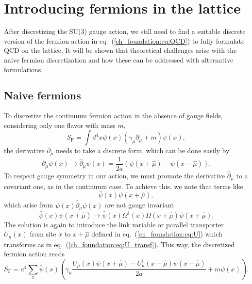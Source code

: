 \section{Introducing fermions in the lattice}
\label{ch_foundation:sec:Fermions}


After discretizing the SU(3) gauge action, we still need to find a suitable discrete version of the fermion action in eq.~(\ref{ch_foundation:eq:QCD}) to fully formulate QCD on the lattice. It will be shown that theoretical challenges arise with the naive fermion discretization and how these can be addressed with alternative formulations.

\subsection{Naive fermions}
\label{ch_foundation:subsec:Naive}

To discretize the continuum fermion action in the absence of gauge fields, considering only one flavor with mass $m$,
\begin{equation}
S_{\textrm{F}}=\int d^4x\bar{\psi}(x)\left(\gamma_{\mu}\partial_{\mu}+m\right)\psi(x),
\end{equation}
the derivative $\partial_{\mu}$ needs to take a discrete form, which can be done easily by
\begin{equation}
\partial_{\mu}\psi(x)\rightarrow\hat{\partial}_{\mu}\psi(x)=\frac{1}{2a}\left(\psi(x+\hat{\mu})-\psi(x-\hat{\mu})\right).
\end{equation}
To respect gauge symmetry in our action, we must promote the derivative $\hat{\partial}_{\mu}$ to a covariant one, as in the continuum case. To achieve this, we note that terms like
\begin{equation}
\bar{\psi}(x)\psi(x+\hat{\mu}),
\end{equation}
which arise from $\bar{\psi}(x)\hat{\partial}_{\mu}\psi(x)$ are not gauge invariant
\begin{equation}
\bar{\psi}(x)\psi(x+\hat{\mu})\to\bar{\psi}(x)\Omega^{\dagger}(x)\Omega(x+\hat{\mu})\psi(x+\hat{\mu}).
\end{equation}
The solution is again to introduce the link variable or parallel transporter $U_{\mu}(x)$ from site $x$ to $x+\hat{\mu}$ defined in eq.~(\ref{ch_foundation:eq:U}) which transforms as in eq.~(\ref{ch_foundation:eq:U_transf}). This way, the discretized fermion action reads
\begin{equation}
\label{ch_foundation:eq:naive}
S_{\textrm{F}}=a^4\sum_x\bar{\psi}(x)\left(\gamma_{\mu}\frac{U_{\mu}(x)\psi(x+\hat{\mu})-U_{\mu}^{\dagger}(x-\hat{\mu})\psi(x-\hat{\mu})}{2a}+m\psi(x)\right).
\end{equation}

